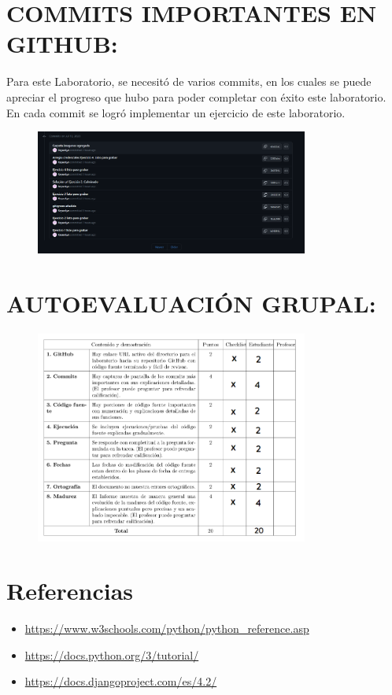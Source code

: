 \documentclass{article}
\begin{document}
\begin{enumerate}
		\section{COMMITS IMPORTANTES EN GITHUB:}
		Para este Laboratorio, se necesitó de varios commits, en los cuales se puede apreciar el progreso que hubo para poder completar con éxito este laboratorio. En cada commit se logró implementar un ejercicio de este laboratorio.
		\begin{figure}[H]
			\centering
			\includegraphics[width=0.8\textwidth,keepaspectratio]{img/Commits.png}
		\end{figure}
		\section{AUTOEVALUACIÓN GRUPAL:}
		\begin{figure}[H]
			\centering
			\includegraphics[width=0.8\textwidth,keepaspectratio]{img/Autocalificacion.png}
		\end{figure}
	\end{enumerate}
	\section{Referencias}
	\begin{itemize}			
		
		\item \url{https://www.w3schools.com/python/python_reference.asp}
		\item \url{https://docs.python.org/3/tutorial/}
		\item \url{https://docs.djangoproject.com/es/4.2/}
	\end{itemize}
	
\end{document}
